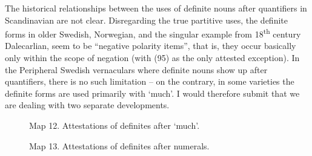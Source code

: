 The historical relationships between the uses of definite nouns after quantifiers in Scandinavian are not clear. Disregarding the true partitive uses, the definite forms in older Swedish, Norwegian, and the singular example from 18\textsuperscript{th} century Dalecarlian, seem to be “negative polarity items”, that is, they occur basically only within the scope of negation (with (95) as the only attested exception). In the Peripheral Swedish vernaculars where definite nouns show up after quantifiers, there is no such limitation – on the contrary, in some varieties the definite forms are used primarily with ‘much’. I would therefore submit that we are dealing with two separate developments. 

\clearpage%


\begin{figure}[h]
\centering
\begin{minipage}{4.19653in}
\label{bkm:Ref224379723}Map 12. Attestations of definites after ‘much’.
\end{minipage}
\end{figure}


\begin{figure}[h]
\centering
\begin{minipage}{4.15in}
Map 13. Attestations of definites after numerals.
\end{minipage}
\end{figure}
\clearpage%


